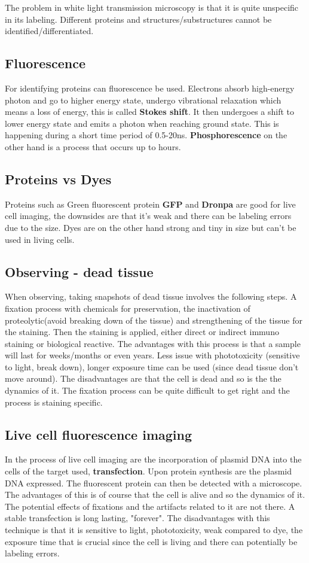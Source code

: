 	The problem in white light transmission microscopy is that it is quite unspecific in its labeling. Different proteins and structures/substructures cannot be identified/differentiated. 

	\subsection*{Fluorescence}
	For identifying proteins can fluorescence be used. Electrons absorb high-energy photon and go to higher energy state, undergo vibrational relaxation which means a loss of energy, this is called \textbf{Stokes shift}. It then undergoes a shift to lower energy state and emits a photon when reaching ground state. This is happening during a short time period of 0.5-20ns. \textbf{Phosphorescence} on the other hand is a process that occurs up to hours. 

	\subsection*{Proteins vs Dyes}
	Proteins such as Green fluorescent protein \textbf{GFP} and \textbf{Dronpa} are good for live cell imaging, the downsides are that it's weak and there can be labeling errors due to the size. Dyes are on the other hand strong and tiny in size but can't be used in living cells. 

	\subsection*{Observing - dead tissue}
	When observing, taking snapshots of dead tissue involves the following steps. A fixation process with chemicals for preservation, the inactivation of proteolytic(avoid breaking down of the tissue) and strengthening of the tissue for the staining. Then the staining is applied, either direct or indirect immuno staining or biological reactive. The advantages with this process is that a sample will last for weeks/months or even years. Less issue with phototoxicity (sensitive to light, break down), longer exposure time can be used (since dead tissue don't move around). The disadvantages are that the cell is dead and so is the the dynamics of it. The fixation process can be quite difficult to get right and the process is staining specific. 


	\subsection*{Live cell fluorescence imaging}
	In the process of live cell imaging are the incorporation of plasmid DNA into the cells of the target used, \textbf{transfection}. Upon protein synthesis are the plasmid DNA expressed. The fluorescent protein can then be detected with a microscope. The advantages of this is of course that the cell is alive and so the dynamics of it. The potential effects of fixations and the artifacts related to it are not there. A stable transfection is long lasting, "forever". The disadvantages with this technique is that it is sensitive to light, phototoxicity, weak compared to dye, the exposure time that is crucial since the cell is living and there can potentially be labeling errors. 

